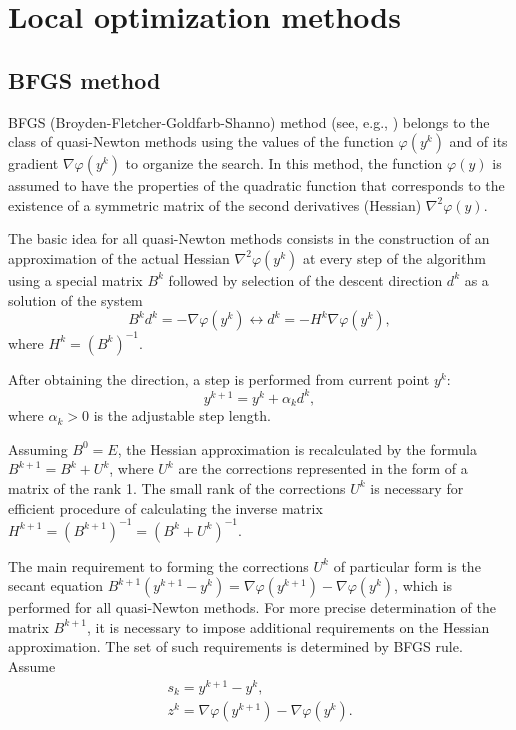\documentclass[runningheads]{llncs}
\begin{document}
\section{Local optimization methods}\label{sec:local}
\subsection{BFGS method}

BFGS (Broyden-Fletcher-Goldfarb-Shanno) method (see, e.g., \cite{Nocedal}) belongs to the class of quasi-Newton methods using the values of the function $\varphi(y^k)$ and of its gradient $\nabla \varphi(y^k)$ to organize the search. In this method, the function $\varphi(y)$ is assumed to have the properties of the quadratic function that corresponds to the existence of a symmetric matrix of the second derivatives (Hessian) $\nabla^2 \varphi(y)$.

The basic idea for all quasi-Newton methods consists in the construction of an approximation of the actual Hessian $\nabla^2 \varphi(y^k)$ at every step of the algorithm using a special matrix $B^k$ followed by selection of the descent direction $d^k$ as a solution of the system
$$ B^k d^k = -\nabla \varphi(y^k) \leftrightarrow d^k = -H^k \nabla \varphi(y^k),$$
where $H^k=\left(B^k\right)^{-1}$.

After obtaining the direction, a step is performed from current point $y^k$:
$$ y^{k+1}=y^k+ \alpha_k d^k,$$
where $\alpha_k>0$ is the adjustable step length.

Assuming $B^0=E$, the Hessian approximation is recalculated by the formula $B^{k+1}= B^k+ U^k$, where $U^k$ are the corrections represented in the form of a matrix of the rank 1. The small rank of the corrections $U^k$ is necessary for efficient procedure of calculating the inverse matrix $H^{k+1}=(B^{k+1})^{-1}=(B^k+ U^k)^{-1}$.

The main requirement to forming the corrections $U^k$ of particular form is the secant equation $B^{k+1} (y^{k+1} - y^k )= \nabla \varphi(y^{k+1})- \nabla \varphi(y^k)$, which is performed for all quasi-Newton methods. For more precise determination of the matrix $B^{k+1}$, it is necessary to impose additional requirements on the Hessian approximation. The set of such requirements is determined by BFGS rule. Assume
\begin{gather}
s_k = y^{k+1} - y^k, \nonumber \\
z^k = \nabla \varphi(y^{k+1})- \nabla \varphi(y^k). \nonumber
\end{gather}
\end{document}

